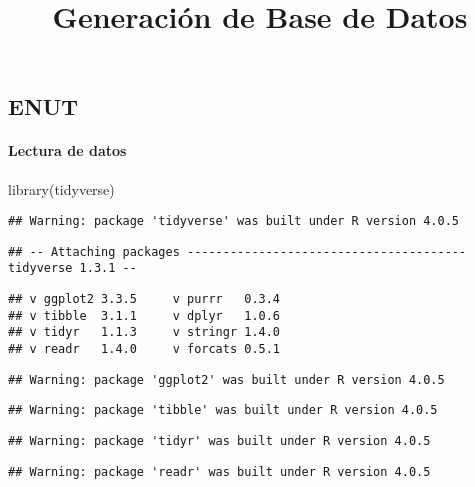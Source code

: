 \documentclass[
]{article}
\title{Generación de Base de Datos}
\author{}
\date{\vspace{-2.5em}}
\newenvironment{Shaded}{\begin{snugshade}}{\end{snugshade}}
\newcommand{\FunctionTok}[1]{\textcolor[rgb]{0.00,0.00,0.00}{#1}}
\newcommand{\NormalTok}[1]{#1}
\begin{document}
\maketitle

\hypertarget{enut}{%
\subsection{ENUT}\label{enut}}

\hypertarget{lectura-de-datos}{%
\paragraph{Lectura de datos}\label{lectura-de-datos}}

\begin{Shaded}
\begin{Highlighting}[]
\FunctionTok{library}\NormalTok{(tidyverse)}
\end{Highlighting}
\end{Shaded}

\begin{verbatim}
## Warning: package 'tidyverse' was built under R version 4.0.5
\end{verbatim}

\begin{verbatim}
## -- Attaching packages --------------------------------------- tidyverse 1.3.1 --
\end{verbatim}

\begin{verbatim}
## v ggplot2 3.3.5     v purrr   0.3.4
## v tibble  3.1.1     v dplyr   1.0.6
## v tidyr   1.1.3     v stringr 1.4.0
## v readr   1.4.0     v forcats 0.5.1
\end{verbatim}

\begin{verbatim}
## Warning: package 'ggplot2' was built under R version 4.0.5
\end{verbatim}

\begin{verbatim}
## Warning: package 'tibble' was built under R version 4.0.5
\end{verbatim}

\begin{verbatim}
## Warning: package 'tidyr' was built under R version 4.0.5
\end{verbatim}

\begin{verbatim}
## Warning: package 'readr' was built under R version 4.0.5
\end{verbatim}
\end{document}
